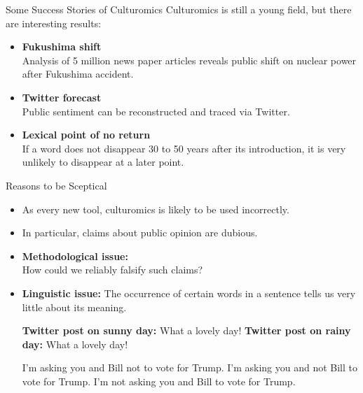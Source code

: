 \documentclass[professionalfonts, xcolor={usenames,svgnames,x11names,table}]{beamer}
\begin{document}
\begin{frame}{Some Success Stories of Culturomics}
	Culturomics is still a young field, but there are interesting results:
		\begin{itemize}
			\item \textbf{Fukushima shift}\\
				Analysis of 5 million news paper articles reveals public shift on nuclear power after Fukushima accident.
			\item \textbf{Twitter forecast}\\
				Public sentiment can be reconstructed and traced via Twitter. 
			\item \textbf{Lexical point of no return}\\
				If a word does not disappear 30 to 50 years after its introduction, it is very unlikely to disappear at a later point.
		\end{itemize}
\end{frame}

\begin{frame}{Reasons to be Sceptical}
    \begin{itemize}
        \item As every new tool, culturomics is likely to be used incorrectly. 
        \item In particular, claims about public opinion are dubious.
        \item \textbf{Methodological issue:}\\
            How could we reliably falsify such claims?
        \item \textbf{Linguistic issue:} The occurrence of certain words in a sentence tells us very little about its meaning.
            \begin{exe}
                \ex
                \begin{xlist}
                    \ex \textbf{Twitter post on sunny day:} What a lovely day!
                    \ex \textbf{Twitter post on rainy day:} What a lovely day!
                \end{xlist}
                \ex
                \begin{xlist}
                    \ex I'm asking you and Bill not to vote for Trump.
                    \ex I'm asking you and not Bill to vote for Trump.
                    \ex I'm not asking you and Bill to vote for Trump.
                \end{xlist}
            \end{exe}
    \end{itemize}
\end{frame}
\end{document}
